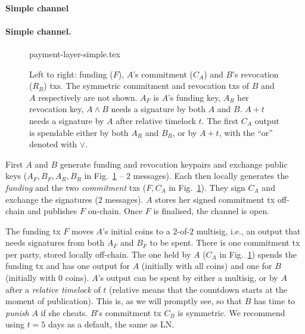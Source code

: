   \makeatletter%
    {\paragraph{Simple channel}}%
    {\paragraph{Simple channel.}}%
  \makeatother%
  \begin{figure}[!htbp]
    \centering
    {payment-layer-simple.tex}
    \caption{Left to right: funding ($F$), $A$'s commitment ($C_A$) and $B$'s
    revocation ($R_B$) txs.
    The symmetric commitment and
    revocation txs of $B$ and $A$ respectively are not shown.
    $A_F$ is $A$'s funding key, $A_R$ her revocation key, $A \wedge B$ needs
    a signature by both $A$ and $B$. $A+t$ needs a signature
    by $A$ after relative timelock $t$. The first $C_A$ output is
    spendable either by both $A_R$ and $B_R$, or by $A + t$, with the ``or'' denoted with $\vee$.}
    \label{figure:payment-layer-simple}
  \end{figure}

  First $A$ and $B$ generate funding and revocation keypairs and exchange
  public keys ($A_F, B_F, A_R, B_R$ in Fig.~\ref{figure:payment-layer-simple} --
  $2$ messages). Each then
  locally generates the \emph{funding} and the two \emph{commitment} txs
  ($F, C_A$ in Fig.~\ref{figure:payment-layer-simple}). They
  sign $C_A$ and exchange the
  signatures ($2$ messages). $A$ stores her
  signed commitment tx off-chain and publishes $F$ on-chain. Once $F$
  is finalised, the channel is open.

  The funding tx $F$ moves $A$'s initial coins to a $2$-of-$2$ multisig, i.e., an
  output that needs signatures from both $A_F$ and $B_F$ to be spent. There is one
  commitment tx per party, stored locally off-chain. The one held by $A$
  ($C_A$ in Fig.~\ref{figure:payment-layer-simple}) spends the funding tx
  and has one output for $A$ (initially with all coins) and one for $B$
  (initially with $0$ coins). $A$'s output can be spent by either a multisig, or
  by $A$ after a \emph{relative timelock} of $t$ (relative means that the countdown starts at the moment of
  publication). This is, as we will promptly see, so
  that $B$ has time to \emph{punish} $A$ if she cheats. $B$'s commitment tx
  $C_B$ is symmetric. We recommend using $t = 5$ days as a default, the same as
  LN.

